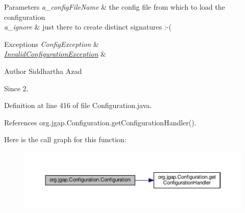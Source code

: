 \begin{DoxyParams}{Parameters}
{\em a\-\_\-config\-File\-Name} & the config file from which to load the configuration \\
\hline
{\em a\-\_\-ignore} & just there to create distinct signatures \-:-\/(\\
\hline
\end{DoxyParams}

\begin{DoxyExceptions}{Exceptions}
{\em Config\-Exception} & \\
\hline
{\em \hyperlink{classorg_1_1jgap_1_1_invalid_configuration_exception}{Invalid\-Configuration\-Exception}} & \\
\hline
\end{DoxyExceptions}
\begin{DoxyAuthor}{Author}
Siddhartha Azad 
\end{DoxyAuthor}
\begin{DoxySince}{Since}
2. 
\end{DoxySince}


Definition at line 416 of file Configuration.\-java.



References org.\-jgap.\-Configuration.\-get\-Configuration\-Handler().



Here is the call graph for this function\-:
\nopagebreak
\begin{figure}[H]
\begin{center}
\leavevmode
\includegraphics[width=350pt]{classorg_1_1jgap_1_1_configuration_a11360483f8ee0ad13e7af351e9232bce_cgraph}
\end{center}
\end{figure}




